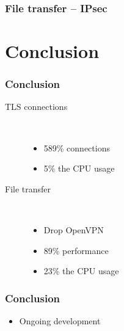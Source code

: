 \documentclass[xcolor={x11names, rgb, usenames, dvipsnames}]{beamer}
\newcommand\Wider[2][3em]{%
\makebox[\linewidth][c]{%
  \begin{minipage}{\dimexpr\textwidth+#1\relax}
  \raggedright#2
  \end{minipage}%
  }%
}
\begin{document}
\begin{frame}
\frametitle{File transfer -- IPsec}
\Wider[1em]{%
	\begin{minipage}[c]{.48\linewidth}
		\begin{tikzpicture}
		
		\end{tikzpicture}
	\end{minipage} \hfill
	\begin{minipage}[c]{.44\linewidth}
		\begin{tikzpicture}
		
		\end{tikzpicture}
		\vspace{0.7cm}
	\end{minipage}
}
\end{frame}





\section{Conclusion}

\begin{frame}
\frametitle{Conclusion}
\begin{description}
	\item[TLS connections]~\\
		\begin{itemize}
			\item 589\% connections
			\item 5\% the CPU usage
		\end{itemize}
	\item[File transfer]~\\
		\begin{itemize}
			\item Drop OpenVPN
			\item 89\% performance
			\item 23\% the CPU usage
		\end{itemize}
\end{description}
\end{frame}


\begin{frame}
\frametitle{Conclusion}
\begin{itemize}
	\item Ongoing development
\end{itemize}

\end{frame}




% 
% 
\end{document}
